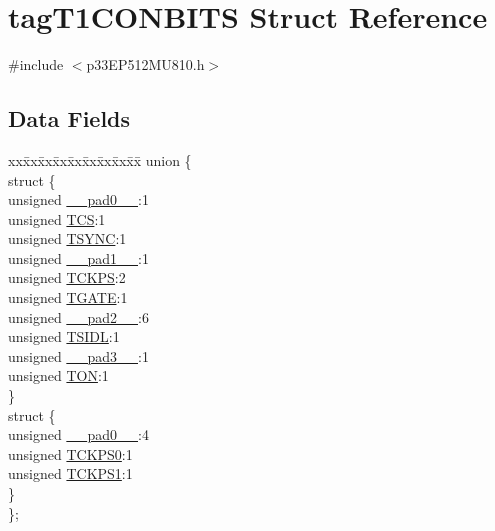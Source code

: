 \hypertarget{structtag_t1_c_o_n_b_i_t_s}{}\section{tag\+T1\+C\+O\+N\+B\+I\+TS Struct Reference}
\label{structtag_t1_c_o_n_b_i_t_s}


{\ttfamily \#include $<$p33\+E\+P512\+M\+U810.\+h$>$}

\subsection*{Data Fields}
\begin{DoxyCompactItemize}
\item 
\begin{tabbing}
xx\=xx\=xx\=xx\=xx\=xx\=xx\=xx\=xx\=\kill
union \{\\
\>struct \{\\
\>\>unsigned \hyperlink{structtag_t1_c_o_n_b_i_t_s_adf71f3d8410c1f1dbbc96680a92c49af}{\_\_pad0\_\_}:1\\
\>\>unsigned \hyperlink{structtag_t1_c_o_n_b_i_t_s_ab4daee3a10870ffba1c86d5020adb9b4}{TCS}:1\\
\>\>unsigned \hyperlink{structtag_t1_c_o_n_b_i_t_s_ada7785ffcd6dd85209227b6645102eaf}{TSYNC}:1\\
\>\>unsigned \hyperlink{structtag_t1_c_o_n_b_i_t_s_acaf2d0924a107ec6e8d2e31febaf66f9}{\_\_pad1\_\_}:1\\
\>\>unsigned \hyperlink{structtag_t1_c_o_n_b_i_t_s_a0d455d68434019feaabe9dfb64d75552}{TCKPS}:2\\
\>\>unsigned \hyperlink{structtag_t1_c_o_n_b_i_t_s_a35b6e4b591a8bd20e026168399eb0e6a}{TGATE}:1\\
\>\>unsigned \hyperlink{structtag_t1_c_o_n_b_i_t_s_a4d97cc5f7d51d22fc2bf3eab35c9cb7f}{\_\_pad2\_\_}:6\\
\>\>unsigned \hyperlink{structtag_t1_c_o_n_b_i_t_s_a4971b881615ef42703b5b78179fcda3d}{TSIDL}:1\\
\>\>unsigned \hyperlink{structtag_t1_c_o_n_b_i_t_s_ad7d7cee33e0c7f447abc4d171c628dd4}{\_\_pad3\_\_}:1\\
\>\>unsigned \hyperlink{structtag_t1_c_o_n_b_i_t_s_a8c2a094047d1019ce1c5b25ea8cff9b3}{TON}:1\\
\>\} \\
\>struct \{\\
\>\>unsigned \hyperlink{structtag_t1_c_o_n_b_i_t_s_adf71f3d8410c1f1dbbc96680a92c49af}{\_\_pad0\_\_}:4\\
\>\>unsigned \hyperlink{structtag_t1_c_o_n_b_i_t_s_a5cd4ef74604f5d88289a53f41cf38b7e}{TCKPS0}:1\\
\>\>unsigned \hyperlink{structtag_t1_c_o_n_b_i_t_s_ae190f2375c403c9fe8f5eb62a5bdf200}{TCKPS1}:1\\
\>\} \\
\}; \\

\end{tabbing}\end{DoxyCompactItemize}


